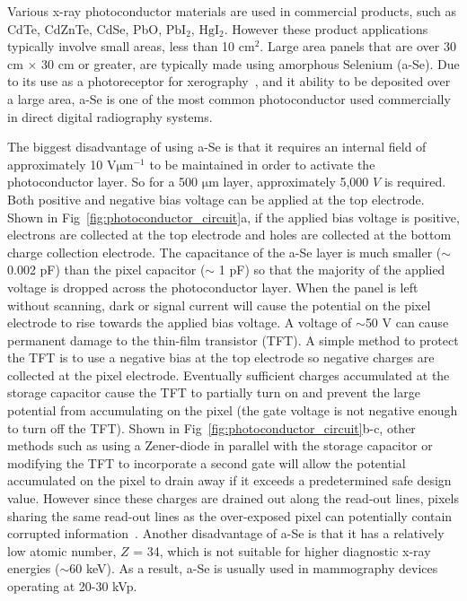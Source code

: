 Various x-ray photoconductor materials are used in commercial products, such as CdTe, CdZnTe, CdSe, PbO, $\mathrm{PbI_2}$, $\mathrm{HgI_2}$.  However these product applications typically involve small areas, less than 10 $\mathrm{cm^2}$.  Large area panels that are over 30 cm $\times$ 30 cm or greater, are typically made using amorphous Selenium (a-Se).  Due to its use as a photoreceptor for xerography~\citep{Mort1989}, and it ability to be deposited over a large area, a-Se is one of the most common photoconductor used commercially in direct digital radiography systems.

The biggest disadvantage of using a-Se is that it requires an internal field of approximately 10 $\mathrm{V \mu m^{-1}}$ to be maintained in order to activate the photoconductor layer.  So for a 500 $\mathrm{\mu m}$ layer, approximately 5,000 $V$ is required.  Both positive and negative bias voltage can be applied at the top electrode.  Shown in Fig~\ref{fig:photoconductor_circuit}a, if the applied bias voltage is positive, electrons are collected at the top electrode and holes are collected at the bottom charge collection electrode.  The capacitance of the a-Se layer is much smaller ($\sim$0.002 pF) than the pixel capacitor ($\sim$ 1 pF) so that the majority of the applied voltage is dropped across the photoconductor layer.  When the panel is left without scanning, dark or signal current will cause the potential on the pixel electrode to rise towards the applied bias voltage.  A voltage of $\sim$50 V can cause permanent damage to the thin-film transistor (TFT).  A simple method to protect the TFT is to use a negative bias at the top electrode so negative charges are collected at the pixel electrode.  Eventually sufficient charges accumulated at the storage capacitor cause the TFT to partially turn on and prevent the large potential from accumulating on the pixel (the gate voltage is not negative enough to turn off the TFT).  Shown in Fig~\ref{fig:photoconductor_circuit}b-c, other methods such as using a Zener-diode in parallel with the storage capacitor or modifying the TFT to incorporate a second gate will allow the potential accumulated on the pixel to drain away if it exceeds a predetermined safe design value.  However since these charges are drained out along the read-out lines, pixels sharing the same read-out lines as the over-exposed pixel can potentially contain corrupted information~\citep{Kasap2002, Rowlands2000}.  Another disadvantage of a-Se is that it has a relatively low atomic number, $Z$ = 34, which is not suitable for higher diagnostic x-ray energies ($\sim$60 keV).  As a result, a-Se is usually used in mammography devices operating at 20-30 kVp.
%

